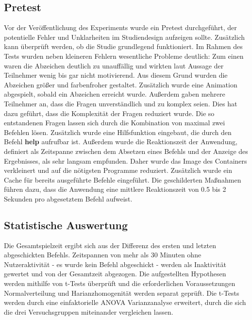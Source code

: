 \subsection{Pretest}\label{verlauf}
Vor der Veröffentlichung des Experiments wurde ein Pretest durchgeführt, der potentielle Fehler und Unklarheiten im Studiendesign aufzeigen sollte. Zusätzlich kann überprüft werden, ob die Studie grundlegend funktioniert. Im Rahmen des Tests wurden neben kleineren Fehlern wesentliche Probleme deutlich: Zum einen waren die Abzeichen deutlich zu unauffällig und wirkten laut Aussage der Teilnehmer wenig bis gar nicht motivierend. Aus diesem Grund wurden die Abzeichen größer und farbenfroher gestaltet. Zusätzlich wurde eine Animation abgespielt, sobald ein Abzeichen erreicht wurde. Außerdem gaben mehrere Teilnehmer an, dass die Fragen unverständlich und zu komplex seien. Dies hat dazu geführt, dass die Komplexität der Fragen reduziert wurde. Die so entstandenen Fragen lassen sich durch die Kombination von maximal zwei Befehlen lösen. Zusätzlich wurde eine Hilfsfunktion eingebaut, die durch den Befehl \textbf{help} aufrufbar ist. Außerdem wurde die Reaktionszeit der Anwendung, definiert als Zeitspanne zwischen dem Absetzen eines Befehls und der Anzeige des Ergebnisses, als sehr langsam empfunden. Daher wurde das Image des Containers verkleinert und auf die nötigsten Programme reduziert. Zusätzlich wurde ein Cache für bereits ausgeführte Befehle eingeführt. Die geschilderten Maßnahmen führen dazu, dass die Anwendung eine mittlere Reaktionszeit von 0.5 bis 2 Sekunden pro abgesetztem Befehl aufweist.


\subsection{Statistische Auswertung}
Die Gesamtspielzeit ergibt sich aus der Differenz des ersten und letzten abgeschickten Befehls. Zeitspannen von mehr als 30 Minuten ohne Nutzeraktivität - es wurde kein Befehl abgeschickt - werden als Inaktivität gewertet und von der Gesamtzeit abgezogen. Die aufgestellten Hypothesen werden mithilfe von t-Tests überprüft und die erforderlichen Voraussetzungen Normalverteilung und Harianzhomogenität werden separat geprüft. Die t-Tests werden durch eine einfaktorielle ANOVA Varianzanalyse erweitert, durch die sich die drei Versuchsgruppen miteinander vergleichen lassen.